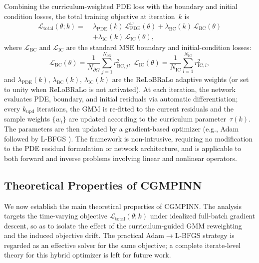 \documentclass{article}
\theoremstyle{plain}
\theoremstyle{definition}
\theoremstyle{remark}
\begin{document}
	Combining the curriculum-weighted PDE loss with the boundary and initial
	condition losses, the total training objective at iteration~$k$ is
	\begin{equation}
		\begin{split}
			\mathcal{L}_{\mathrm{total}}(\theta;k)
			=\;&\lambda_{\mathrm{PDE}}(k)\,
			\mathcal{L}_{\mathrm{PDE}}^{w}(\theta)
			+\lambda_{\mathrm{BC}}(k)\,
			\mathcal{L}_{\mathrm{BC}}(\theta)\\
			&+\lambda_{\mathrm{IC}}(k)\,
			\mathcal{L}_{\mathrm{IC}}(\theta),
		\end{split}
		\label{eq:total_loss}
	\end{equation}
	where $\mathcal{L}_{\mathrm{BC}}$ and $\mathcal{L}_{\mathrm{IC}}$
	are the standard MSE boundary and initial-condition losses:
	\begin{equation}
		\mathcal{L}_{\mathrm{BC}}(\theta)
		=\frac{1}{N_{\partial\Omega}}\sum_{j=1}^{N_{\partial\Omega}}r_{\mathrm{BC},j}^{2},\;
		\mathcal{L}_{\mathrm{IC}}(\theta)
		=\frac{1}{N_{\mathrm{IC}}}\sum_{l=1}^{N_{\mathrm{IC}}}r_{\mathrm{IC},l}^{2},
		\label{eq:bc_ic_loss}
	\end{equation}
	and $\lambda_{\mathrm{PDE}}(k)$, $\lambda_{\mathrm{BC}}(k)$,
	$\lambda_{\mathrm{IC}}(k)$ are the ReLoBRaLo adaptive weights
	(or set to unity when ReLoBRaLo is not activated).
	At each iteration, the network evaluates PDE, boundary, and initial
	residuals via automatic differentiation; every $k_{\mathrm{upd}}$
	iterations, the GMM is re-fitted to the current residuals and the
	sample weights $\{w_i\}$ are updated according to the curriculum
	parameter~$\tau(k)$.
	The parameters are then updated by a gradient-based optimizer
	(e.g., Adam followed by L-BFGS \cite{Haghighat45}).
	The framework is non-intrusive, requiring no modification to the PDE
	residual formulation or network architecture, and is applicable to both
	forward and inverse problems involving linear and nonlinear operators.


\subsection{Theoretical Properties of CGMPINN}
\label{sec:theory}

We now establish the main theoretical properties of CGMPINN.
The analysis targets the time-varying objective
$\mathcal{L}_{\mathrm{total}}(\theta;k)$ under idealized full-batch
gradient descent, so as to isolate the effect of the curriculum-guided
GMM reweighting and the induced objective drift.
The practical Adam$\to$L-BFGS strategy is regarded as an
effective solver for the same objective; a complete iterate-level theory
for this hybrid optimizer is left for future work.
\end{document}

